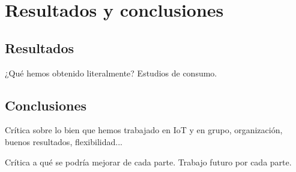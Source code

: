 \section{Resultados y conclusiones}\label{sec:conclusion}

\subsection{Resultados}

¿Qué hemos obtenido literalmente? Estudios de consumo.

\subsection{Conclusiones}

Crítica sobre lo bien que hemos trabajado en IoT y en grupo, organización, buenos resultados, flexibilidad...

Crítica a qué se podría mejorar de cada parte. Trabajo futuro por cada parte.